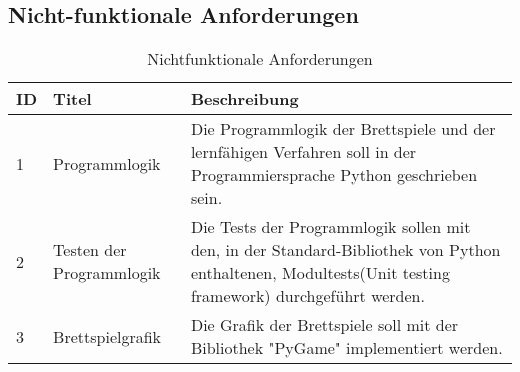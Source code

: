 \subsection{Nicht-funktionale Anforderungen}

\begin{table}
\caption{Nichtfunktionale Anforderungen}
\begin{tabular}{ | p{} | p{} | p{} |}
\hline
\ac{ID} & Titel & Beschreibung \\ \hline
1 & Programmlogik & Die Programmlogik der Brettspiele und der lernfähigen Verfahren soll in der Programmiersprache Python geschrieben sein. \\ \hline
2 & Testen der Programmlogik & Die Tests der Programmlogik sollen mit den, in der Standard-Bibliothek von Python enthaltenen, Modultests(Unit testing framework) durchgeführt werden. \\ \hline
3 & Brettspielgrafik & Die Grafik der Brettspiele soll mit der Bibliothek "PyGame" implementiert werden. \\ \hline

\end{tabular}
\label{tab:funktionale_anforderungen}
\end{table}
